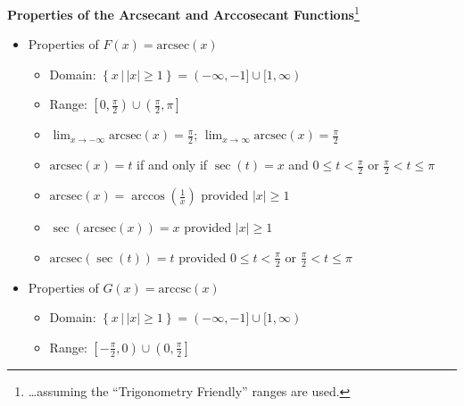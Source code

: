 \documentclass{ximera}
\begin{document}
\begin{theorem} \label{arcsecantcosecantfunctionprops1}  \textbf{Properties of the Arcsecant and Arccosecant Functions}\footnote{\ldots assuming the ``Trigonometry Friendly'' ranges are used.} 

\begin{itemize}

\item Properties of $F(x)= \text{arcsec}(x)$  

\begin{itemize}

\item Domain:  $\left\{ x \, | \,  |x| \geq 1 \right\} = (-\infty, -1] \cup [1,\infty)$

\item Range:  $\left[0, \frac{\pi}{2} \right) \cup \left(\frac{\pi}{2}, \pi\right]$

\item  $\lim_{x \rightarrow -\infty} \text{arcsec}(x) =\frac{\pi}{2}$; $\lim_{x \rightarrow \infty} \text{arcsec}(x)=\frac{\pi}{2}$

\item  $\text{arcsec}(x) = t$ if and only if $\sec(t) = x$ and $0 \leq t < \frac{\pi}{2}$ or $ \frac{\pi}{2} < t \leq \pi$

\item  $\text{arcsec}(x) = \arccos\left(\frac{1}{x}\right)$ provided $|x| \geq 1$

\item  $\sec\left(\text{arcsec}(x)\right) = x$ provided $|x| \geq 1$

\item  $\text{arcsec}(\sec(t)) = t$ provided $0 \leq t < \frac{\pi}{2}$ or $\frac{\pi}{2} < t \leq \pi$

\end{itemize}

\item  Properties of $G(x) = \text{arccsc}(x)$  

\begin{itemize}

\item  Domain:  $\left\{ x \, | \,  |x| \geq 1 \right\} = (-\infty, -1] \cup [1,\infty)$

\item Range:  $\left[-\frac{\pi}{2}, 0 \right) \cup \left(0, \frac{\pi}{2} \right]$


\end{itemize}
\end{itemize}
\end{theorem}
\end{document}
